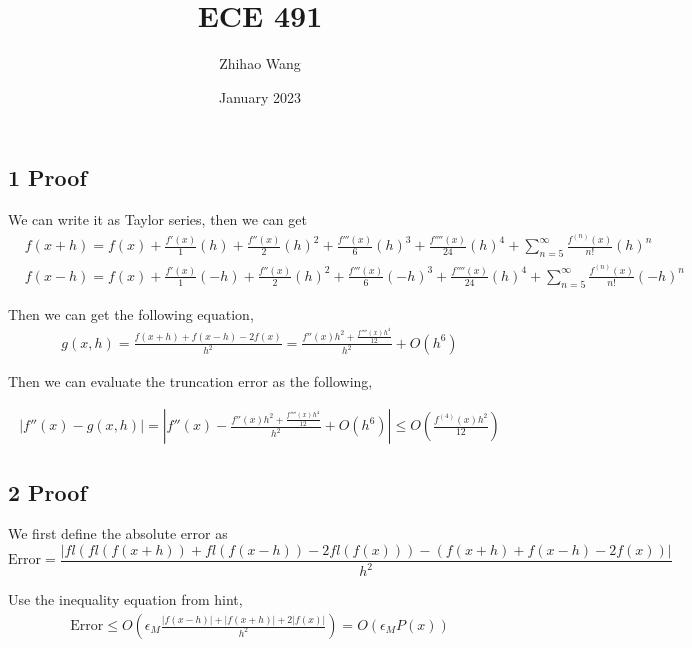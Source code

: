 \documentclass{article}
\title{ECE 491}
\author{Zhihao Wang}
\date{January 2023}
\begin{document}
\maketitle

\subsection*{1 Proof}




We can write it as Taylor series, then we can get 
\[
\begin{split}
&f(x + h) = f(x) + \frac{f'(x)}{1}(h ) + \frac{f''(x)}{2}(h )^2 + \frac{f'''(x)}{6}(h)^3 + \frac{f''''(x)}{24}(h )^4 + \sum \limits_{n=5}^\infty \frac {{f^{(n)}} (x)}{n!} (h)^n \\
&f(x - h) = f(x) + \frac{f'(x)}{1}(-h ) + \frac{f''(x)}{2}(h )^2 + \frac{f'''(x)}{6}(-h)^3 + \frac{f''''(x)}{24}(h )^4 + \sum \limits_{n=5}^\infty \frac {{f^{(n)}} (x)}{n!} (-h)^n 
\end{split}
\]

Then we can get the following equation,
\[
\begin{split}
g(x, h) = \frac{f(x + h) + f(x - h) - 2f(x)}{h^2} = \frac{f''(x)h^2 + \frac{f''''(x)h^4}{12}}{h^2} + O(h^6)
\end{split}
\]

Then we can evaluate the truncation error as the following,

\[
\begin{split}
|f''(x) - g(x, h)| = |f''(x) - \frac{f''(x)h^2 + \frac{f''''(x)h^4}{12}}{h^2} + O(h^6)| \le O(\frac{f^{(4)}(x)h^2}{12}) 
\end{split}
\]

\subsection*{2 Proof}

We first define the absolute error as 
$$\text{Error} = \frac{|fl(fl(f(x+h)) + fl(f(x - h)) - 2fl(f(x))) - (f(x + h) + f(x - h) - 2f(x))|}{h^2}$$

Use the inequality equation from hint,
\[
\begin{split}
\text{Error} \le O(\epsilon_M \frac{|f(x-h)| + |f(x+h)| + 2|f(x)|}{h^2}) =  O(\epsilon_M P(x))
\end{split}
\]
\end{document}
